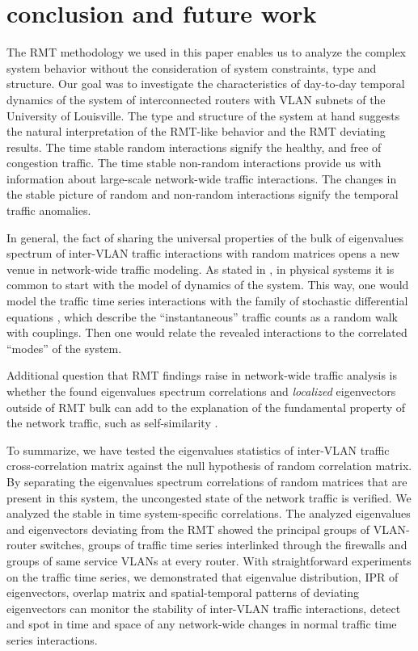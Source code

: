 \documentclass{IEEEtran}
\begin{document}
\section{conclusion and future work}

The RMT methodology we used in this paper enables us to analyze the
complex system behavior without the consideration of system constraints,
type and structure. Our goal was to investigate the characteristics
of day-to-day temporal dynamics of the system of interconnected routers
with VLAN subnets of the University of Louisville. The type and structure
of the system at hand suggests the natural interpretation of the RMT-like
behavior and the RMT deviating results. The time stable random interactions
signify the healthy, and free of congestion traffic. The time stable
non-random interactions provide us with information about large-scale
network-wide traffic interactions. The changes in the stable picture
of random and non-random interactions signify the temporal traffic
anomalies. 

In general, the fact of sharing the universal properties of the bulk
of eigenvalues spectrum of inter-VLAN traffic interactions with random
matrices opens a new venue in network-wide traffic modeling. As stated
in \cite{Guhr1}, in physical systems it is common to start with the
model of dynamics of the system. This way, one would model the traffic
time series interactions with the family of stochastic differential
equations \cite{Farmer,Cont}, which describe the {}``instantaneous''
traffic counts 
as a random walk with couplings. Then one would relate the revealed
interactions to the correlated {}``modes'' of the system.

Additional question that RMT findings raise in network-wide traffic
analysis is whether the found eigenvalues spectrum correlations and
\emph{localized} eigenvectors outside of RMT bulk can add to the explanation
of the fundamental property of the network traffic, such as self-similarity
\cite{Leland}. 

To summarize, we have tested the eigenvalues statistics of inter-VLAN
traffic cross-correlation matrix  against the null hypothesis
of random correlation matrix. By separating the eigenvalues spectrum
correlations of random matrices that are present in this system, the
uncongested state of the network traffic is verified. We analyzed
the stable in time system-specific correlations. The analyzed eigenvalues
and eigenvectors deviating from the RMT showed the principal groups
of VLAN-router switches, groups of traffic time series interlinked
through the firewalls and groups of same service VLANs at every router.
With straightforward experiments on the traffic time series, we demonstrated
that eigenvalue distribution, IPR of eigenvectors, overlap matrix
and spatial-temporal patterns of deviating eigenvectors can monitor
the stability of inter-VLAN traffic interactions, detect and spot
in time and space of any network-wide changes in normal traffic time
series interactions.
\end{document}
